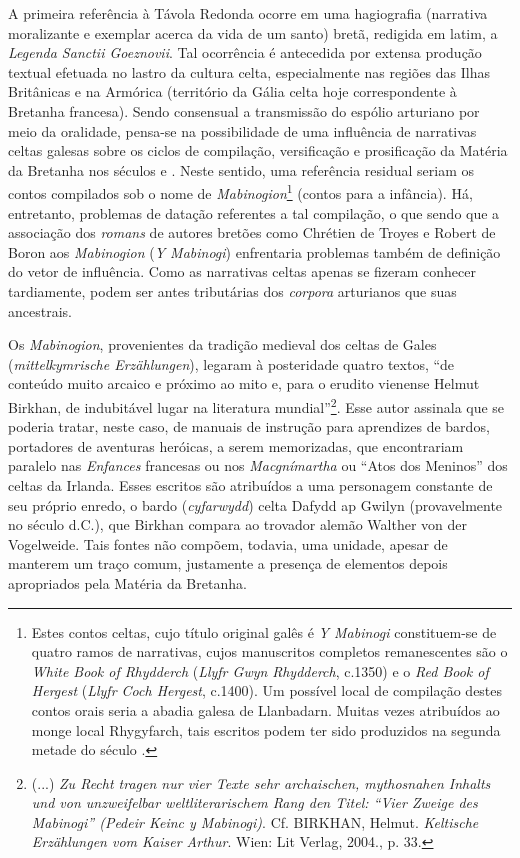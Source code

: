 A primeira referência à Távola Redonda ocorre em uma hagiografia (narrativa
moralizante e exemplar acerca da vida de um santo) bretã, redigida em latim, a
\textit{Legenda Sanctii Goeznovii}. Tal ocorrência é antecedida por extensa
produção textual efetuada no lastro da cultura celta, especialmente nas regiões
das Ilhas Britânicas e na Armórica (território da Gália celta hoje
correspondente à Bretanha francesa). Sendo consensual a transmissão do espólio
arturiano por meio da oralidade, pensa-se na possibilidade de uma influência de
narrativas celtas galesas sobre os ciclos de compilação, versificação e
prosificação da Matéria da Bretanha nos séculos  e . Neste sentido, uma
referência residual seriam os contos compilados sob o nome de
\textit{Mabinogion}\footnote{ Estes contos celtas, cujo título original galês é
\textit{Y Mabinogi} constituem-se de quatro ramos de narrativas, cujos
manuscritos completos remanescentes são o \textit{White Book of Rhydderch}
(\textit{Llyfr Gwyn Rhydderch}, c.1350) e o \textit{Red Book of Hergest}
(\textit{Llyfr Coch Hergest}, c.1400). Um possível local de compilação destes
contos orais seria a abadia galesa de Llanbadarn. Muitas vezes atribuídos ao
monge local Rhygyfarch, tais escritos podem ter sido produzidos na segunda
metade do século .} (contos para a infância). Há, entretanto, problemas de
datação referentes a tal compilação, o que sendo que a associação dos
\textit{romans} de autores bretões como Chrétien de Troyes e Robert de Boron
aos \textit{Mabinogion} (\textit{Y Mabinogi}) enfrentaria problemas também de
definição do vetor de influência. Como as narrativas celtas apenas se fizeram
conhecer tardiamente, podem ser antes tributárias dos \textit{corpora}
arturianos que suas ancestrais.

Os \textit{Mabinogion}, provenientes da tradição medieval dos celtas de Gales
(\textit{mittelkymrische Erzählungen}), legaram à posteridade quatro textos,
“de conteúdo muito arcaico e próximo ao mito e, para o erudito vienense Helmut
Birkhan, de indubitável lugar na literatura mundial”\footnote{ (...) \textit{Zu
Recht tragen nur vier Texte sehr archaischen, mythosnahen Inhalts und von
unzweifelbar weltliterarischem Rang den Titel: “Vier Zweige des Mabinogi”
(Pedeir Keinc y Mabinogi)}. Cf. BIRKHAN, Helmut. \textit{Keltische Erzählungen
vom Kaiser Arthur}. Wien: Lit Verlag, 2004., p. 33. }. Esse autor assinala que
se poderia tratar, neste caso, de manuais de instrução para aprendizes de
bardos, portadores de aventuras heróicas, a serem memorizadas, que encontrariam
paralelo nas \textit{Enfances }francesas ou nos \textit{Macgnímartha} ou “Atos
dos Meninos” dos celtas da Irlanda. Esses escritos são atribuídos a uma
personagem constante de seu próprio enredo, o bardo (\textit{cyfarwydd}) celta
Dafydd ap Gwilyn (provavelmente no século  d.C.), que Birkhan compara ao
trovador alemão Walther von der Vogelweide. Tais fontes não compõem, todavia,
uma unidade, apesar de manterem um traço comum, justamente a presença de
elementos depois apropriados pela Matéria da Bretanha. 

